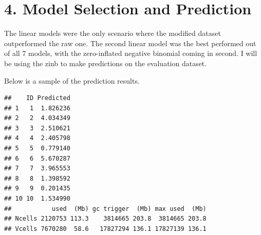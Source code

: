 \documentclass[]{article}
\begin{document}
\hypertarget{model-selection-and-prediction}{%
\section{4. Model Selection and
Prediction}\label{model-selection-and-prediction}}

The linear models were the only scenario where the modified dataset
outperformed the raw one. The second linear model was the best performed
out of all 7 models, with the zero-inflated negative binomial coming in
second. I will be using the zinb to make predictions on the evaluation
dataset.

Below is a sample of the prediction results.

\begin{verbatim}
##    ID Predicted
## 1   1  1.826236
## 2   2  4.034349
## 3   3  2.510621
## 4   4  2.405798
## 5   5  0.779140
## 6   6  5.670287
## 7   7  3.965553
## 8   8  1.398592
## 9   9  0.201435
## 10 10  1.534990
##           used  (Mb) gc trigger  (Mb) max used  (Mb)
## Ncells 2120753 113.3    3814665 203.8  3814665 203.8
## Vcells 7670280  58.6   17827294 136.1 17827139 136.1
\end{verbatim}
\end{document}
